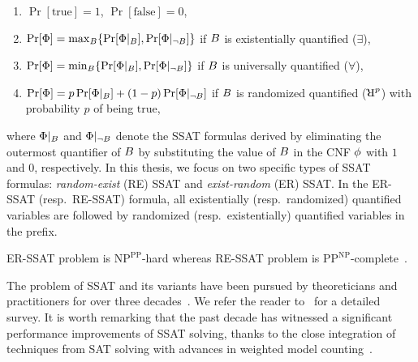 \begin{enumerate}
	\item $ \Pr[\text{true}] = 1 $,  $ \Pr[\text{false}] = 0 $, 
	\item $ \Pr [\Phi] = \max_{B} \{\Pr[\Phi|_{B}], \Pr[\Phi|_{\neg B}]\}$ if $ B $ is existentially quantified ($ \exists $), 
	\item $ \Pr [\Phi] = \min_{B} \{\Pr[\Phi|_{B}], \Pr[\Phi|_{\neg B}]\} $ if $ B $ is universally quantified ($ \forall $), 
	\item $ \Pr [\Phi] = p\Pr[\Phi|_{B}] + (1-p) \Pr[\Phi|_{\neg B}] $ if $ B $ is randomized quantified ($\R^{p}$) with probability $p$ of being $\text{true}$,
\end{enumerate}

where $ \Phi|_{B} $ and $ \Phi|_{\neg B} $ denote the SSAT formulas derived by eliminating the outermost quantifier of $ B $  by substituting the value of $ B $ in the CNF $ \phi $ with $ 1 $ and $ 0 $, respectively. In this thesis, we focus on two specific types of SSAT formulas:  \textit{random-exist} (RE) SSAT and \textit{exist-random} (ER) SSAT. In the ER-SSAT (resp.\ RE-SSAT) formula, all existentially (resp.\ randomized) quantified variables are followed by randomized (resp.\ existentially) quantified variables in the prefix.


\begin{remark}
	ER-SSAT problem is $\mathrm{NP}^{\mathrm{PP}}$-hard whereas RE-SSAT problem is $\mathrm{PP}^{\mathrm{NP}}$-complete~\cite{littman2001stochastic}.
\end{remark}



The problem of SSAT and its variants have been pursued by theoreticians and practitioners for over three decades~\cite{majercik2005dc,fremont2017maximum,huang2006combining}. We refer the reader to~\cite{lee2017solving,lee2018solving} for a detailed survey. It is worth remarking that the past decade has witnessed a significant performance improvements of SSAT solving, thanks to the close integration of techniques from SAT solving with advances in weighted model counting~\cite{sang2004combining,chakraborty2013scalable,chakraborty2014distribution}. 


